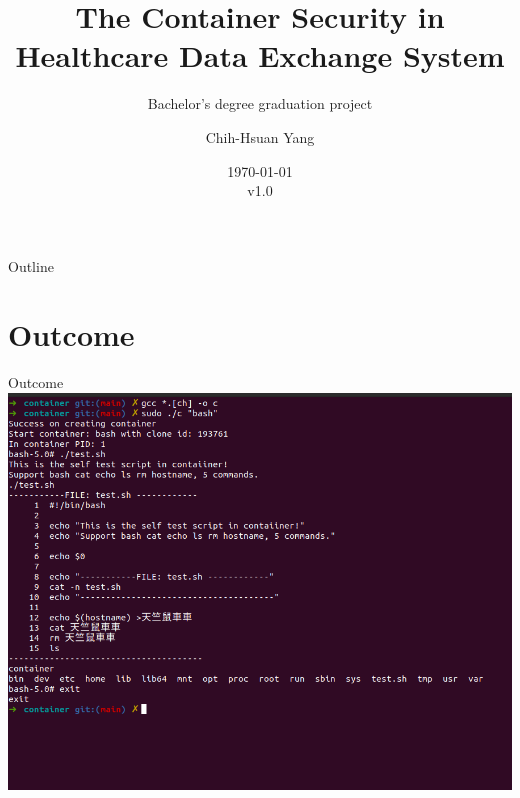 \documentclass{beamer}
\title{The Container Security in Healthcare Data Exchange System}
\subtitle{Bachelor's degree graduation project}
\author{Chih-Hsuan Yang}
\institute{National Sun Yat-sen University\\
Advisor: Chun-I Fan
}
\date{\today\\v1.0}
\begin{document}
\begin{frame}
    \titlepage
\end{frame}

\begin{frame}{Outline}
    \begin{multicols}{2}
        \tableofcontents
    \end{multicols}
\end{frame}

\section{Outcome}
\begin{frame}{Outcome}
    \centering\includegraphics[width=.9\textwidth]{cur_cont.png}
\end{frame}
\end{document}
